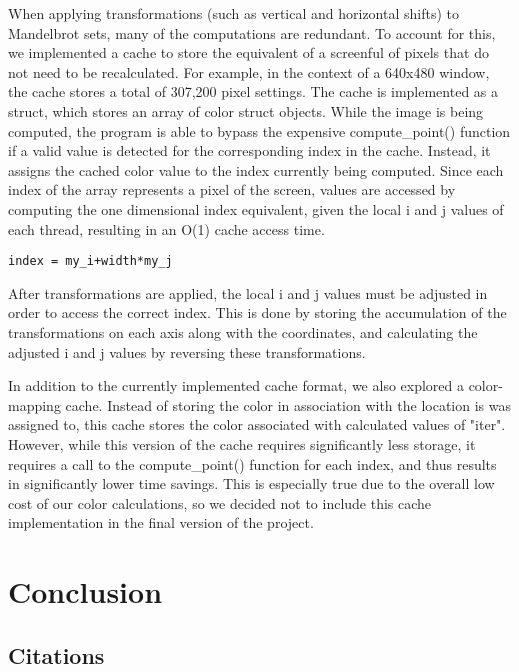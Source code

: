 \documentclass{article}
\begin{document}
When applying transformations (such as vertical and horizontal shifts) to Mandelbrot sets, many of the computations are redundant. To account for this, we implemented a cache to store the equivalent of a screenful of pixels that do not need to be recalculated. For example, in the context of a 640x480 window, the cache stores a total of 307,200 pixel settings. The cache is implemented as a struct, which stores an array of color struct objects. While the image is being computed, the program is able to bypass the expensive compute\_point() function if a valid value is detected for the corresponding index in the cache. Instead, it assigns the cached color value to the index currently being computed. Since each index of the array represents a pixel of the screen, values are accessed by computing the one dimensional index equivalent, given the local i and j values of each thread, resulting in an O(1) cache access time. 

\begin{verbatim}
index = my_i+width*my_j
\end{verbatim}

After transformations are applied, the local i and j values must be adjusted in order to access the correct index. This is done by storing the accumulation of the transformations on each axis along with the coordinates, and calculating the adjusted i and j values by reversing these transformations. 

In addition to the currently implemented cache format, we also explored a color-mapping cache. Instead of storing the color in association with the location is was assigned to, this cache stores the color associated with calculated values of "iter". However, while this version of the cache requires significantly less storage, it requires a call to the compute\_point() function for each index, and thus results in significantly lower time savings. This is especially true due to the overall low cost of our color calculations, so we decided not to include this cache implementation in the final version of the project.

\section{Conclusion}

\begin{center}


\section*{Citations}

\end{center}
\end{document}
